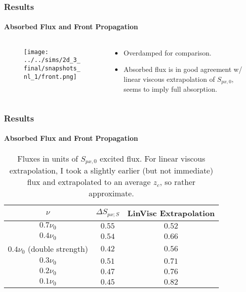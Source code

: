 \documentclass[dvipsnames]{beamer}
\begin{document}
\begin{frame}
    \frametitle{Results}
    \framesubtitle{Absorbed Flux and Front Propagation}

    \begin{columns}
        \begin{column}{0.5\textwidth}
            \begin{figure}[t]
                \centering
                \texttt{[image: ../../sims/2d\_3\_final/snapshots\_nl\_1/front.png]}
            \end{figure}
        \end{column}
        \begin{column}{0.5\textwidth}
            \begin{itemize}
                \item Overdamped for comparison.

                \item Absorbed flux is in good agreement w/ linear viscous
                    extrapolation of $S_{px, 0}$, seems to imply full
                    absorption.
            \end{itemize}
        \end{column}
    \end{columns}
\end{frame}

\begin{frame}
    \frametitle{Results}
    \framesubtitle{Absorbed Flux and Front Propagation}

    \begin{table}[t]
        \centering
        \begin{tabular}{c c c}
            $\nu$ & $\Delta S_{px; S}$ & LinVisc Extrapolation\\\midrule
            $0.7\nu_0$ & $0.55$ & $0.52$\\
            $0.4\nu_0$ & $0.54$ & $0.66$\\
            $0.4\nu_0$ (double strength) & $0.42$ & $0.56$\\
            $0.3\nu_0$ & $0.51$ & $0.71$\\
            $0.2\nu_0$ & $0.47$ & $0.76$\\
            $0.1\nu_0$ & $0.45$ & $0.82$
        \end{tabular}
        \caption{Fluxes in units of $S_{px, 0}$ excited flux. For linear viscous
        extrapolation, I took a slightly earlier (but not immediate) flux and
        extrapolated to an average $z_c$, so rather approximate.}
    \end{table}
\end{frame}
\end{document}
